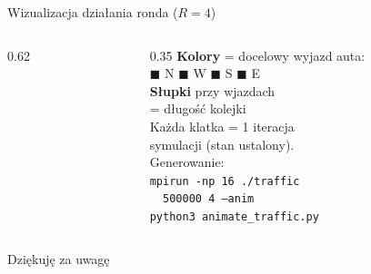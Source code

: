 \documentclass[aspectratio=169]{beamer}
\begin{document}
\begin{frame}{Wizualizacja działania ronda ($R=4$)}
  \begin{columns}
    \begin{column}{0.62\textwidth}
      \centering
    \end{column}
    \begin{column}{0.35\textwidth}
      \small
      \textbf{Kolory} = docelowy wyjazd auta:\\[0.4em]
      {\color{red!70!black}$\blacksquare$} N \quad
      {\color{blue!70!black}$\blacksquare$} W \quad
      {\color{green!60!black}$\blacksquare$} S \quad
      {\color{orange!80!black}$\blacksquare$} E \\[0.8em]
      \textbf{Słupki} przy wjazdach\\= długość kolejki\\[0.8em]
      Każda klatka = 1 iteracja\\
      symulacji (stan ustalony).\\[0.8em]
      Generowanie:\\[0.2em]
      \texttt{\scriptsize mpirun -np 16 ./traffic}\\
      \texttt{\scriptsize \ \ 500000 4 --anim}\\
      \texttt{\scriptsize python3 animate\_traffic.py}
    \end{column}
  \end{columns}
\end{frame}

\begin{frame}{}
  \centering
  \Huge Dziękuję za uwagę
\end{frame}
\end{document}
